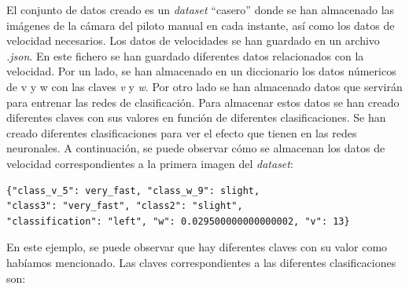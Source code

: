 El conjunto de datos creado es un \textit{dataset} ``casero'' donde se han almacenado las imágenes de la cámara del piloto manual en cada instante, así como los datos de velocidad necesarios. Los datos de velocidades se han guardado en un archivo \textit{.json}. En este fichero se han guardado diferentes datos relacionados con la velocidad. Por un lado, se han almacenado en un diccionario los datos númericos de v y w con las claves \textit{v} y \textit{w}. Por otro lado se han almacenado datos que servirán para entrenar las redes de clasificación. Para almacenar estos datos se han creado diferentes claves con sus valores en función de diferentes clasificaciones. Se han creado diferentes clasificaciones para ver el efecto que tienen en las redes neuronales. A continuación, se puede observar cómo se almacenan los datos de velocidad correspondientes a la primera imagen del \textit{dataset}:\\

\begin{lstlisting}
{"class_v_5": very_fast, "class_w_9": slight, 
"class3": "very_fast", "class2": "slight", 
"classification": "left", "w": 0.029500000000000002, "v": 13}
\end{lstlisting}
\vspace{20pt}

En este ejemplo, se puede observar que hay diferentes claves con su valor como habíamos mencionado. Las claves correspondientes a las diferentes clasificaciones son:

